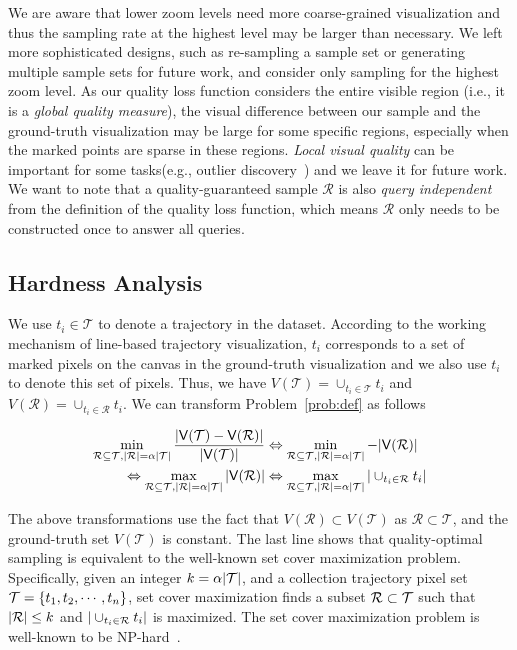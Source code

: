 We are aware that lower zoom levels need more coarse-grained visualization and thus the sampling rate at the highest level may be larger than necessary. We left more sophisticated designs, such as re-sampling a sample set or generating multiple sample sets for future work, and consider only sampling for the highest zoom level. As our quality loss function considers the entire visible region (i.e., it is a \textit{global quality measure}), the visual difference between our sample and the ground-truth visualization may be large for some specific regions, especially when the marked points are sparse in these regions. \textit{Local visual quality} can be important for some tasks(e.g., outlier discovery~\cite{feng2010matching,mayorga2013splatterplots}) and we leave it for future work. We want to note that a quality-guaranteed sample $\mathcal{R}$ is also \textit{query independent} from the definition of the quality loss function, which means $\mathcal{R}$ only needs to be constructed once to answer all queries.

\subsection{Hardness Analysis}\label{sec:hard}
We use $t_i \in \mathcal{T}$ to denote a trajectory in the dataset. According to the working mechanism of line-based trajectory visualization, $t_i$ corresponds to a set of marked pixels on the canvas in the ground-truth visualization and we also use $t_i$ to denote this set of pixels. Thus, we have $V(\mathcal{T}) = \cup_{t_i \in \mathcal{T}} t_i$ and $V(\mathcal{R}) = \cup_{t_i \in \mathcal{R}} t_i$. We can transform Problem~\ref{prob:def} as follows

\begin{align}\label{eqn:obj2} \nonumber
\min_{\oR \subseteq \D, |\oR| = \alpha |\D|}  \frac{|\V(\D) - \V(\oR)|}{|\V(\D)|}  & \Leftrightarrow \min_{\oR \subseteq \D, |\oR| = \alpha |\D|}   - |\V(\oR)| \\ \nonumber
 \Leftrightarrow \max_{\oR \subseteq \D, |\oR| = \alpha |\D|}  |\V(\oR)| &  \Leftrightarrow \max_{\oR \subseteq \D, |\oR| = \alpha |\D|} | \cup_{t_i \in \oR} t_i |
\end{align}

The above transformations use the fact that $V(\mathcal{R}) \subset V(\mathcal{T})$ as $\mathcal{R} \subset \mathcal{T}$, and the ground-truth set $V(\mathcal{T})$ is constant. The last line shows that quality-optimal sampling is equivalent to the well-known set cover maximization problem.
Specifically, given an integer $k = \alpha |\mathcal{T}|$, and a collection trajectory pixel set $\mathcal{T} = \{t_1, t_2, \cdots, t_n \}$, set cover maximization finds a subset $\mathcal{R} \subset \mathcal{T}$ such that $|\mathcal{R}| \leq k$ and $|\cup_{t_i \in \mathcal{R}} t_i|$ is maximized. The set cover maximization problem is well-known to be NP-hard~\cite{setcover}.


